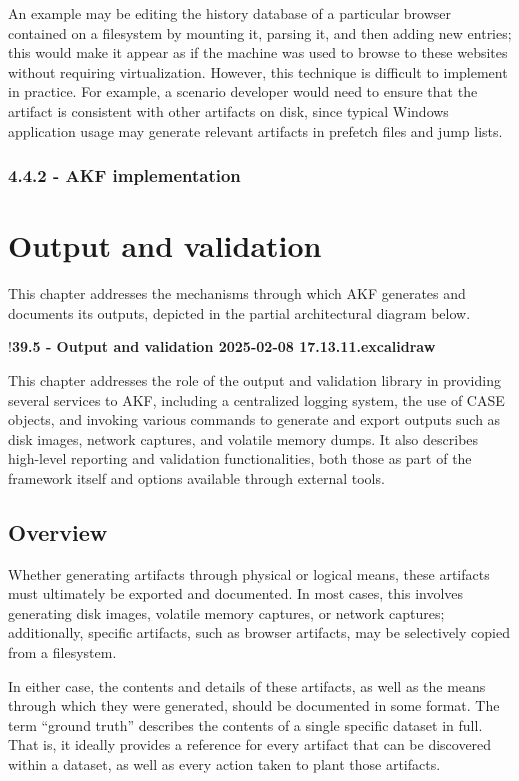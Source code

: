 \documentclass[letterpaper,12pt]{report}
\begin{document}
An example may be editing the history database of a particular browser
contained on a filesystem by mounting it, parsing it, and then adding
new entries; this would make it appear as if the machine was used to
browse to these websites without requiring virtualization. However, this
technique is difficult to implement in practice. For example, a scenario
developer would need to ensure that the artifact is consistent with
other artifacts on disk, since typical Windows application usage may
generate relevant artifacts in prefetch files and jump lists.

\subsection*{4.4.2 - AKF implementation}\label{akf-implementation}

\chapter{Output and validation}\label{chapter-five}

This chapter addresses the mechanisms through which AKF generates and
documents its outputs, depicted in the partial architectural diagram
below.

!\textbf{39.5 - Output and validation 2025-02-08 17.13.11.excalidraw}

This chapter addresses the role of the output and validation library in
providing several services to AKF, including a centralized logging
system, the use of CASE objects, and invoking various commands to
generate and export outputs such as disk images, network captures, and
volatile memory dumps. It also describes high-level reporting and
validation functionalities, both those as part of the framework itself
and options available through external tools.

\section{Overview}\label{overview}

Whether generating artifacts through physical or logical means, these
artifacts must ultimately be exported and documented. In most cases,
this involves generating disk images, volatile memory captures, or
network captures; additionally, specific artifacts, such as browser
artifacts, may be selectively copied from a filesystem.

In either case, the contents and details of these artifacts, as well as
the means through which they were generated, should be documented in
some format. The term ``ground truth'' describes the contents of a
single specific dataset in full. That is, it ideally provides a
reference for every artifact that can be discovered within a dataset, as
well as every action taken to plant those artifacts.
\end{document}
